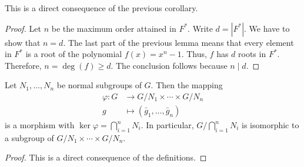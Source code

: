 \begin{prop}
    This is a direct consequence of the previous corollary.
\end{prop}

\begin{proof} Let $n$ be the maximum order attained in $F^*$. Write $d=|F^*|$. We have to show that $n=d$. The last part of the previous lemma means that every element in $F^*$ is a root of the polynomial $f(x)=x^n-1$. Thus, $f$ has $d$ roots in $F^*$. Therefore, $n=\deg(f)\ge d$. The conclusion follows because $n\mid d$.  \end{proof}


\begin{prop}\label{map-to-quotient-product}
    Let\/ $N_1, \dots, N_n$ be normal subgroups of\/ $G$. Then the mapping
    \begin{align*}
        \varphi\colon G &\to G/N_1 \times \cdots \times G/N_n\\
        g &\mapsto (\bar g_1, \dots, \bar g_n)
    \end{align*}
    is a morphism with\/ $\ker\varphi =\bigcap_{i=1}^n N_i$. In particular, $G/\bigcap_{i=1}^n N_i$ is isomorphic to a subgroup of\/ $G/N_1 \times\cdots\times G/N_n$.
\end{prop}

\begin{proof} This is a direct consequence of the definitions.  \end{proof}

